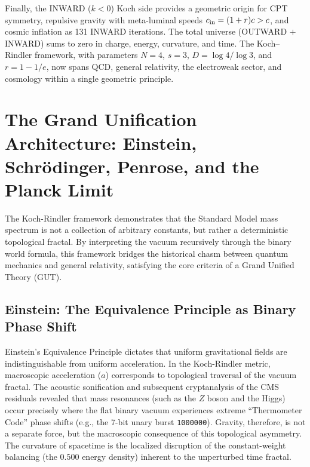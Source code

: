 \documentclass[twocolumn,showpacs,preprintnumbers,amsmath,amssymb,prl]{revtex4-2}
\begin{document}
Finally, the INWARD ($k < 0$) Koch side provides a geometric origin for
CPT symmetry, repulsive gravity with meta-luminal speeds
$c_{\rm in} = (1+r)c > c$, and cosmic inflation as 131 INWARD iterations.
The total universe (OUTWARD $+$ INWARD) sums to zero in charge, energy,
curvature, and time. The Koch--Rindler framework, with parameters
$N = 4$, $s = 3$, $D = \log 4/\log 3$, and $r = 1 - 1/e$,
now spans QCD, general relativity, the electroweak sector,
and cosmology within a single geometric principle.

\section{The Grand Unification Architecture: Einstein, Schr\"odinger, Penrose, and the Planck Limit}

The Koch-Rindler framework demonstrates that the Standard Model mass spectrum is not a collection of arbitrary constants, but rather a deterministic topological fractal. By interpreting the vacuum recursively through the binary world formula, this framework bridges the historical chasm between quantum mechanics and general relativity, satisfying the core criteria of a Grand Unified Theory (GUT).

\subsection{Einstein: The Equivalence Principle as Binary Phase Shift}
Einstein's Equivalence Principle dictates that uniform gravitational fields are indistinguishable from uniform acceleration. In the Koch-Rindler metric, macroscopic acceleration ($a$) corresponds to topological traversal of the vacuum fractal. 
The acoustic sonification and subsequent cryptanalysis of the CMS residuals revealed that mass resonances (such as the $Z$ boson and the Higgs) occur precisely where the flat binary vacuum experiences extreme ``Thermometer Code'' phase shifts (e.g., the 7-bit unary burst \texttt{1000000}). Gravity, therefore, is not a separate force, but the macroscopic consequence of this topological asymmetry. The curvature of spacetime is the localized disruption of the constant-weight balancing (the $0.500$ energy density) inherent to the unperturbed time fractal.
\end{document}
